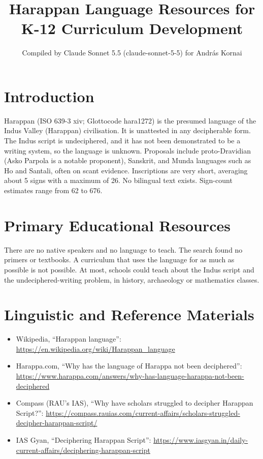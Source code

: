 \documentclass[12pt]{article}
\title{Harappan Language Resources for K-12 Curriculum Development}
\author{Compiled by Claude Sonnet 5.5 (claude-sonnet-5-5) for Andr\'as Kornai}
\date{}
\begin{document}
\maketitle

\section{Introduction}
Harappan (ISO 639-3 xiv; Glottocode hara1272) is the presumed language of the Indus Valley (Harappan) civilisation. It is unattested in any decipherable form. The Indus script is undeciphered, and it has not been demonstrated to be a writing system, so the language is unknown. Proposals include proto-Dravidian (Asko Parpola is a notable proponent), Sanskrit, and Munda languages such as Ho and Santali, often on scant evidence. Inscriptions are very short, averaging about 5 signs with a maximum of 26. No bilingual text exists. Sign-count estimates range from 62 to 676.

\section{Primary Educational Resources}
There are no native speakers and no language to teach. The search found no primers or textbooks. A curriculum that uses the language for as much as possible is not possible. At most, schools could teach about the Indus script and the undeciphered-writing problem, in history, archaeology or mathematics classes.

\section{Linguistic and Reference Materials}
\begin{itemize}
\item Wikipedia, ``Harappan language'': \url{https://en.wikipedia.org/wiki/Harappan_language}
\item Harappa.com, ``Why has the language of Harappa not been deciphered'': \url{https://www.harappa.com/answers/why-has-language-harappa-not-been-deciphered}
\item Compass (RAU's IAS), ``Why have scholars struggled to decipher Harappan Script?'': \url{https://compass.rauias.com/current-affairs/scholars-struggled-decipher-harappan-script/}
\item IAS Gyan, ``Deciphering Harappan Script'': \url{https://www.iasgyan.in/daily-current-affairs/deciphering-harappan-script}
\end{itemize}
\end{document}
